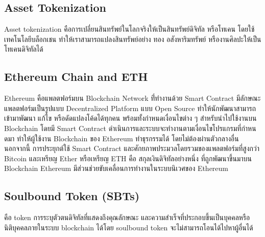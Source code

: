 \documentclass[12pt,oneside,openright,a4paper]{cpe-thai-project}
\begin{document}
\subsection{Asset Tokenization  \cite{erc721}}
\tab Asset tokenization คือการเปลี่ยนสินทรัพย์ในโลกจริงให้เป็นสินทรัพย์ดิจิทัล หรือโทเคน โดยใช้เทคโนโลยีบล็อกเชน ทำให้เราสามารถแปลงสินทรัพย์อย่าง ทอง อสังหาริมทรัพย์ หรืองานศิลปะให้เป็นโทเคนดิจิทัลได้

\subsection{Ethereum Chain and ETH\cite{eth}}
\tab Ethereum คือแพลตฟอร์มบน Blockchain Network ที่่ทํางานด้วย Smart Contract มีลักษณะแพลตฟอร์มเป็นรูปแบบ Decentralized Platform แบบ Open Source ทําให้นักพัฒนาสามารถเข้ามาพัฒนา แก้ไข หรือดัดแปลงโค้ดได้ทุกคน พร้อมทั้งกําหนดเงื่อนไขต่าง ๆ สําหรับนําไปใช้งานบน Blockchain โดยมี Smart Contract ดําเนินการและระบบจะทํางานตามเงื่อนไขโปรแกรมที่กําหนดมา ทําให้ผู้ใช้งาน Blockchain ของ Ethereum ทําธุรกรรมได้ โดยไม่ต้องผ่านตัวกลางอื่น นอกจากนี้ การประยุกต์ใช้ Smart Contract และศักยภาพประมวลโดยรวมของแพลตฟอร์มที่สูงกว่า Bitcoin และเหรียญ Ether หรือเหรียญ ETH คือ สกุลเงินดิจิทัลอย่างหนึ่ง ที่ถูกพัฒนาขึ้นมาบน Blockchain Ethereum มีส่วนช่วยขับเคลื่อนการทํางานในระบบนิเวศของ Ethereum

\subsection{Soulbound Token (SBTs)\cite{sbts}}
\tab คือ token การระบุตัวตนดิจิทัลที่แสดงถึงคุณลักษณะ และความสำเร็จที่ประกอบขึ้นเป็นบุคคลหรือนิติบุคคลภายในระบบ blockchain ได้โดย soulbound token จะไม่สามารถโอนได้ไปหาผู้อื่นได้
\end{document}
